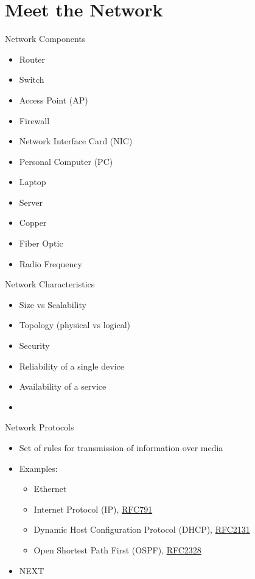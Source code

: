 \section[meet]{Meet the Network}

\begin{frame}{Network Components}
	\begin{itemize}[<2->]
		\item Router
		\item Switch
		\item Access Point (AP)
		\item Firewall
		\item Network Interface Card (NIC)
	\end{itemize}
	\begin{itemize}[<3->]
		\item Personal Computer (PC)
		\item Laptop
		\item Server
	\end{itemize}
	\begin{itemize}[<4->]
		\item Copper
		\item Fiber Optic
		\item Radio Frequency
	\end{itemize}
\end{frame}
\begin{frame}{Network Characteristics}
	\begin{itemize}[<+->]
		\item Size vs Scalability
		\item Topology (physical vs logical)
		\item Security
		\item Reliability of a single device
		\item Availability of a service
		\item 
	\end{itemize}
\end{frame}
\begin{frame}{Network Protocols}
	\begin{itemize}[<+->]
		\item Set of rules for transmission of information over media
		\item Examples:
		\begin{itemize}
			\item Ethernet
			\item Internet Protocol (IP), \href{https://tools.ietf.org/html/rfc791}{RFC791}
			\item Dynamic Host Configuration Protocol (DHCP), \href{https://tools.ietf.org/html/rfc2131}{RFC2131}
			\item Open Shortest Path First (OSPF), \href{https://tools.ietf.org/html/rfc2328}{RFC2328}
		\end{itemize}
		\item NEXT
	\end{itemize}
\end{frame}
